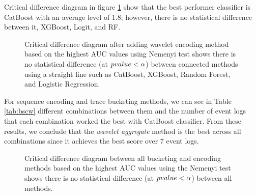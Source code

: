 Critical difference diagram in figure \ref{fig:cdw} show that the best performer classifier is CatBoost with an average level of 1.8; however, there is no statistical difference between it, XGBoost, Logit, and RF.


\begin{figure}[!htbp]
	\begin{center}
		\caption[Critical difference diagram wavelet plus CatBoost]{Critical difference diagram after adding wavelet encoding method based on the highest AUC values using Nemenyi test shows there is no statistical difference (at $p\-value < \alpha$) between connected methods using a straight line such as CatBoost, XGBoost, Random Forest, and Logistic Regression.}
		\label{fig:cdw}
	\end{center}
\end{figure}

For sequence encoding and trace bucketing methods, we can see in Table \ref{tab:bscw} different combinations between them and the number of event logs that each combination worked the best with CatBoost classifier. From these results, we conclude that the \textit{wavelet aggregate} method is the best across all combinations since it achieves the best score over $7$ event logs. 


\begin{figure}[!htbp]
	\begin{center}
		\caption[Critical difference diagram for all bucketing and encoding methods Wavelet plus CatBoost]{Critical difference diagram between all bucketing and encoding methods based on the highest AUC values using the Nemenyi test shows there is no statistical difference (at $p\-value < \alpha$) between all methods.}
		\label{fig:wavelet5}
	\end{center}
\end{figure}


